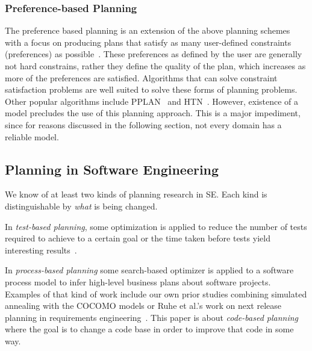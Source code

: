 \documentclass[10pt,journal,compsoc]{IEEEtran}
\begin{document}
\subsubsection{Preference-based Planning}
\label{sect:pref_plan}
The preference based planning is an extension of the above planning schemes with a focus on producing plans that satisfy as many user-defined constraints (preferences) as possible~\cite{son06}. These preferences as defined by the user are generally not hard constrains, rather they define the quality of the plan, which increases as more of the preferences are satisfied. Algorithms that can solve constraint satisfaction problems are well suited to solve these forms of planning problems. Other popular algorithms include PPLAN~\cite{son06} and HTN~\cite{baier09}. However, existence of a model precludes the use of this planning approach. This is a major impediment, since for reasons discussed in the following section, not every domain has a reliable model.

\subsection{Planning in Software Engineering}
We know of at least two kinds of planning research in SE. Each kind is distinguishable by {\em what} is being changed.

In {\em test-based planning}, some optimization is applied to reduce the number of tests required to achieve to a certain goal  or the time taken before tests yield interesting results~\cite{tallam2006concept, yoo2012regression, blue2013interaction}.



In {\em process-based planning} some search-based optimizer is applied to a software process model to infer high-level business plans about software projects. Examples of that kind of work include our own prior studies combining simulated annealing with the COCOMO models or Ruhe et al.'s work on next release planning in requirements engineering~\cite{ruhe2003quantitative, ruhe2010product}. This paper is about {\em code-based planning} where the goal is to change a code base in order to improve that code in some way.
\end{document}
